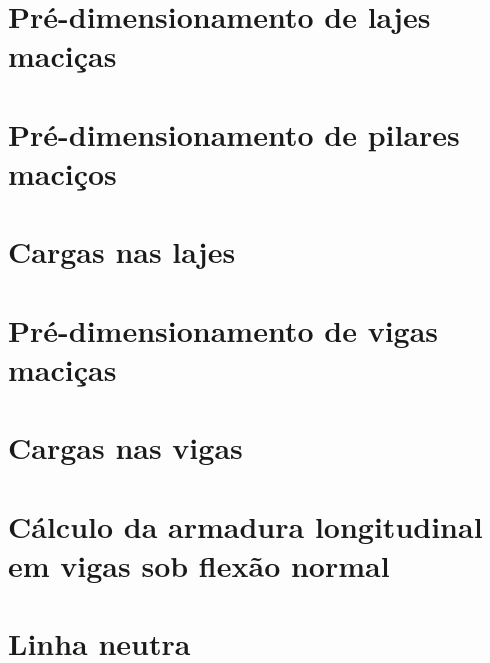 \documentclass[12pt, a4paper]{article}
\begin{document}
	

	\section{Pré-dimensionamento de lajes maciças}
	

	\section{Pré-dimensionamento de pilares maciços}
	

	\section{Cargas nas lajes}
		

	\section{Pré-dimensionamento de vigas maciças}
	

	\section{Cargas nas vigas}
	

	\section{Cálculo da armadura longitudinal em vigas sob flexão normal}
	

	\section{Linha neutra}
	
\end{document}
